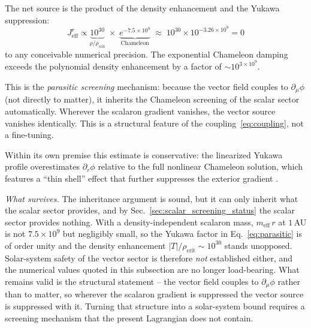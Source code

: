 \documentclass[aps,prd,twocolumn,superscriptaddress,nofootinbib]{revtex4-2}
\begin{document}
The net source is the product of the density enhancement and the Yukawa suppression:
\begin{equation}
J^r_{\mathrm{eff}} \propto \underbrace{10^{30}}_{\rho/\rho_{\mathrm{crit}}} \;\times\; \underbrace{e^{-7.5 \times 10^9}}_{\text{Chameleon}} \;\approx\; 10^{30} \times 10^{-3.26 \times 10^9} = 0
\label{eq:parasitic}
\end{equation}
to any conceivable numerical precision. The exponential Chameleon damping exceeds the polynomial density enhancement by a factor of $\sim 10^{3 \times 10^9}$.

This is the \textit{parasitic screening} mechanism: because the vector field couples to $\partial_\mu\phi$ (not directly to matter), it inherits the Chameleon screening of the scalar sector automatically. Wherever the scalaron gradient vanishes, the vector source vanishes identically. This is a structural feature of the coupling~\eqref{eq:coupling}, not a fine-tuning.

Within its own premise this estimate is conservative: the linearized Yukawa profile overestimates $\partial_r\phi$ relative to the full nonlinear Chameleon solution, which features a ``thin shell'' effect that further suppresses the exterior gradient \cite{HuSawicki2007}.

\textit{What survives.} The inheritance argument is sound, but it can only inherit what the scalar sector provides, and by Sec.~\ref{sec:scalar_screening_status} the scalar sector provides nothing. With a density-independent scalaron mass, $m_{\mathrm{eff}}\,r$ at $1$\,AU is not $7.5 \times 10^{9}$ but negligibly small, so the Yukawa factor in Eq.~\eqref{eq:parasitic} is of order unity and the density enhancement $|T|/\rho_{\mathrm{crit}} \sim 10^{30}$ stands unopposed. Solar-system safety of the vector sector is therefore \textit{not} established either, and the numerical values quoted in this subsection are no longer load-bearing. What remains valid is the structural statement -- the vector field couples to $\partial_\mu\phi$ rather than to matter, so wherever the scalaron gradient is suppressed the vector source is suppressed with it. Turning that structure into a solar-system bound requires a screening mechanism that the present Lagrangian does not contain.
\end{document}
